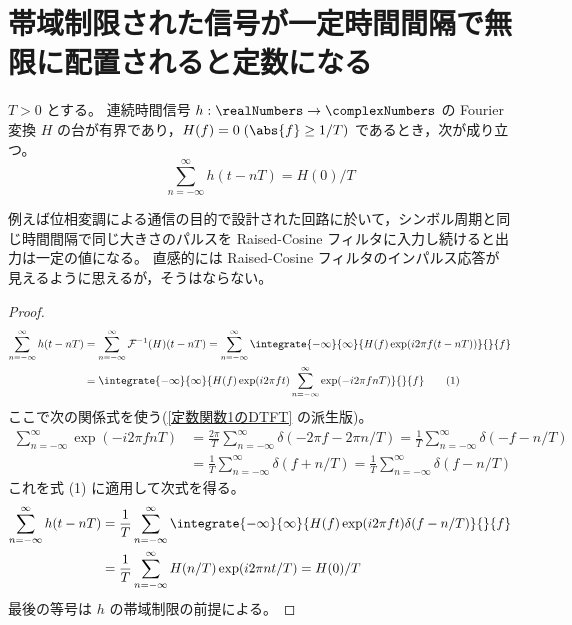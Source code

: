     \section{帯域制限された信号が一定時間間隔で無限に配置されると定数になる}
        \begin{shadebox}
            $T>0$ とする。
            連続時間信号 $h:\realNumbers\to\complexNumbers$ の Fourier 変換 $H$ の台が有界であり，$H(f)=0\;(\abs{f}\geq 1/T)$ であるとき，次が成り立つ。
            \[ \sum_{n=-\infty}^\infty h(t-nT) = H(0)/T \]
        \end{shadebox}
        例えば位相変調による通信の目的で設計された回路に於いて，シンボル周期と同じ時間間隔で同じ大きさのパルスを Raised-Cosine フィルタに入力し続けると出力は一定の値になる。
        直感的には Raised-Cosine フィルタのインパルス応答が見えるように思えるが，そうはならない。
        \begin{proof}
            \begin{align*}
                \sum_{n=-\infty}^\infty h(t-nT) &= \sum_{n=-\infty}^\infty \mathcal{F}^{-1}(H)(t-nT) = \sum_{n=-\infty}^\infty\integrate{-\infty}{\infty}{H(f)\exp(i2\pi f(t-nT))}{}{f} \\
                &= \integrate{-\infty}{\infty}{H(f)\exp(i2\pi ft)\sum_{n=-\infty}^\infty\exp(-i2\pi fnT)}{}{f} \tag{1}
            \end{align*}
            ここで次の関係式を使う(\ref{定数関数1のDTFT} の派生版)。
            \begin{align*}
                \sum_{n=-\infty}^\infty\exp(-i2\pi fnT) &= \frac{2\pi}{T}\sum_{n=-\infty}^\infty\delta(-2\pi f - 2\pi n/T) = \frac{1}{T}\sum_{n=-\infty}^\infty\delta(-f - n/T) \\
                &= \frac{1}{T}\sum_{n=-\infty}^\infty\delta(f + n/T) = \frac{1}{T}\sum_{n=-\infty}^\infty\delta(f - n/T)
            \end{align*}
            これを式 (1) に適用して次式を得る。
            \begin{align*}
                \sum_{n=-\infty}^\infty h(t-nT) &= \frac{1}{T}\sum_{n=-\infty}^\infty\integrate{-\infty}{\infty}{H(f)\exp(i2\pi ft)\delta(f-n/T)}{}{f} \\
                &= \frac{1}{T}\sum_{n=-\infty}^\infty H(n/T)\exp(i2\pi nt/T) = H(0)/T
            \end{align*}
            最後の等号は $h$ の帯域制限の前提による。
        \end{proof}